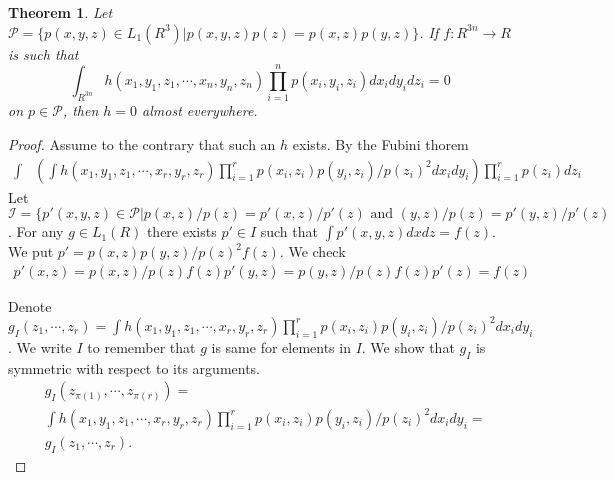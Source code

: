 \documentclass{article}
\newtheorem{Theorem}{Theorem}
\begin{document}
\begin{Theorem}
\label{th:1}
Let $\mathcal P = \{ p(x,y,z) \in L_1(R^3) | p(x,y,z)p(z) = p(x,z)p(y,z) \}$. If $f : R^{3n} \to R$ is such that 
\[
 \int_{R^{3n}} h(x_1,y_1,z_1,\cdots,x_n,y_n,z_n) \prod_{i=1}^n p(x_i,y_i,z_i) d x_i d y_i d z_i = 0
\]
on $p \in \mathcal P$, then $h=0$ almost everywhere.
\end{Theorem}

\begin{proof}
Assume to the contrary that such an $h$ exists. By the Fubini thorem  
\begin{align}
 \int& \left(\int h(x_1,y_1,z_1,\cdots, x_r,y_r,z_r) \prod_{i=1}^r p(x_i,z_i)p(y_i,z_i)/p(z_i)^2 dx_i dy_i  \right)  \prod_{i=1}^r p(z_i)dz_i
\end{align}
Let $\mathcal I = \{ p'(x,y,z) \in \mathcal P | p(x,z)/p(z) = p'(x,z)/p'(z) \text{ and }(y,z)/p(z) = p'(y,z)/p'(z)$. For any $g \in L_1(R)$ there exists $p' \in I$ such that $\int p'(x,y,z) dx dz = f(z)$. We put $p' = p(x,z)p(y,z)/p(z)^2 f(z)$. We check 
\begin{align}
 p'(x,z) = p(x,z)/p(z) f(z)
 p'(y,z) = p(y,z)/p(z) f(z)
 p'(z) = f(z)
\end{align}



Denote $g_{I}( z_1,\cdots,z_r) = \int h(x_1,y_1,z_1,\cdots, x_r,y_r,z_r) \prod_{i=1}^r p(x_i,z_i)p(y_i,z_i)/p(z_i)^2 dx_i dy_i$. We write $I$ to remember that $g$ is same for elements in $I$. We show that $g_{I}$ is symmetric with respect to its arguments. 
\begin{align}
&g_{I}(z_{\pi(1)}, \cdots,z_{\pi(r)} )  = \\ 
& \int h(x_1,y_1,z_1,\cdots, x_r,y_r,z_r) \prod_{i=1}^r p(x_i,z_i)p(y_i,z_i)/p(z_i)^2 dx_i dy_i = \\
&g_{I}(z_1, \cdots,z_r ). 
\end{align}


\end{proof}
\end{document}
